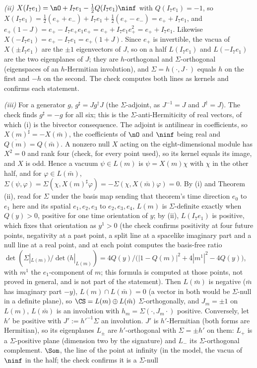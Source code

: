 \emph{(ii)} $X(I_{7}e_{1}) = \nO + I_{7}e_{1} - \tfrac12 Q(I_{7}e_{1})\ninf$ with $Q(I_{7}e_{1}) = -1$, so $X(I_{7}e_{1}) = \tfrac12(e_{+} + e_{-}) + I_{7}e_{1} + \tfrac12(e_{+} - e_{-}) = e_{+} + I_{7}e_{1}$, and $e_{+}(1 - J) = e_{+} - I_{7}e_{+}e_{1}e_{+} = e_{+} + I_{7}e_{1}e_{+}^{2} = e_{+} + I_{7}e_{1}$. Likewise $X(-I_{7}e_{1}) = e_{+} - I_{7}e_{1} = e_{+}(1 + J)$. Since $e_{+}$ is invertible, the vacua of $X(\pm I_{7}e_{1})$ are the $\pm 1$ eigenvectors of $J$, so on a half $L(I_{7}e_{1})$ and $L(-I_{7}e_{1})$ are the two eigenplanes of $J$; they are $h$-orthogonal and $\Sigma$-orthogonal (eigenspaces of an $h$-Hermitian involution), and $\Sigma = h(\cdot, J\cdot)$ equals $h$ on the first and $-h$ on the second. The check computes both lines as kernels and confirms each statement.

\emph{(iii)} For a generator $g$, $g^{\sharp} = J g^{\dagger}J$ (the $\Sigma$-adjoint, as $J^{-1} = J$ and $J^{\dagger} = J$). The check finds $g^{\sharp} = -g$ for all six; this is the $\Sigma$-anti-Hermiticity of real vectors, of which (i) is the bivector consequence. The adjoint is antilinear in coefficients, so $X(m)^{\sharp} = -X(\bar m)$, the coefficients of $\nO$ and $\ninf$ being real and $\overline{Q(m)} = Q(\bar m)$. A nonzero null $X$ acting on the eight-dimensional module has $X^{2} = 0$ and rank four (check, for every point used), so its kernel equals its image, and $X$ is odd. Hence a vacuum $\psi \in L(m)$ is $\psi = X(m)\chi$ with $\chi$ in the other half, and for $\varphi \in L(\bar m)$, $\Sigma(\psi, \varphi) = \Sigma(\chi, X(m)^{\sharp}\varphi) = -\Sigma(\chi, X(\bar m)\varphi) = 0$. By (i) and Theorem (ii), read for $\Sigma$ under the basis map sending that theorem's time direction $e_{0}$ to $e_{1}$ here and its spatial $e_{1}, e_{2}, e_{3}$ to $e_{2}, e_{3}, e_{4}$, $L(m)$ is $\Sigma$-definite exactly when $Q(y) > 0$, positive for one time orientation of $y$; by (ii), $L(I_{7}e_{1})$ is positive, which fixes that orientation as $y^{1} > 0$ (the check confirms positivity at four future points, negativity at a past point, a split line at a spacelike imaginary part and a null line at a real point, and at each point computes the basis-free ratio $\det(\Sigma|_{L(m)})/\det(h|_{L(m)}) = 4Q(y)/\bigl(|1 - Q(m)|^{2} + 4|m^{1}|^{2} - 4Q(y)\bigr)$, with $m^{1}$ the $e_{1}$-component of $m$; this formula is computed at those points, not proved in general, and is not part of the statement). Then $L(\bar m)$ is negative ($\bar m$ has imaginary part $-y$), $L(m) \cap L(\bar m) = 0$ (a vector in both would be $\Sigma$-null in a definite plane), so $\CS = L(m) \oplus L(\bar m)$ $\Sigma$-orthogonally, and $J_{m} = \pm 1$ on $L(m)$, $L(\bar m)$ is an involution with $h_{m} = \Sigma(\cdot, J_{m}\cdot)$ positive. Conversely, let $h'$ be positive with $J' := h'^{-1}\Sigma$ an involution. $J'$ is $h'$-Hermitian (both forms are Hermitian), so its eigenplanes $L_{\pm}$ are $h'$-orthogonal with $\Sigma = \pm h'$ on them: $L_{+}$ is a $\Sigma$-positive plane (dimension two by the signature) and $L_{-}$ its $\Sigma$-orthogonal complement. $\Som$, the line of the point at infinity (in the model, the vacua of $\ninf$ in the half; the check confirms it is a $\Sigma$-null 
